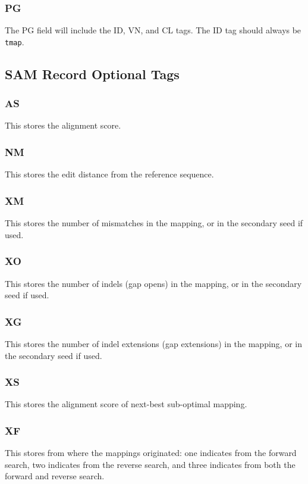 \documentclass[a4paper,12pt]{book}
\newcommand{\TT}[1]{{\tt #1}} %
\begin{document}
\subsubsection{PG}
The PG field will include the ID, VN, and CL tags.
The ID tag should always be \TT{tmap}.

\subsection{SAM Record Optional Tags}

\subsubsection{AS}
This stores the alignment score.

\subsubsection{NM}
This stores the edit distance from the reference sequence.

\subsubsection{XM}
This stores the number of mismatches in the mapping, or in the secondary seed if used.

\subsubsection{XO}
This stores the number of indels (gap opens) in the mapping, or in the secondary seed if used.

\subsubsection{XG}
This stores the number of indel extensions (gap extensions) in the mapping, or in the secondary seed if used.

\subsubsection{XS}
This stores the alignment score of next-best sub-optimal mapping.

\subsubsection{XF}
This stores from where the mappings originated: one indicates from the forward search, two indicates from the reverse search, and three indicates from both the forward and reverse search.
\end{document}

